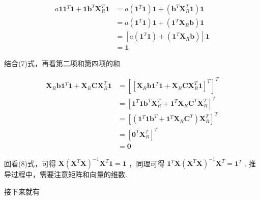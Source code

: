 \documentclass[UTF8]{ctexart}
\begin{document}
    \begin{equation}
    	\begin{aligned}
    		a \boldsymbol{1} \boldsymbol{1}^T \boldsymbol{1} + \boldsymbol{1} \boldsymbol{b}^T \boldsymbol{X}_R^T \boldsymbol{1} & = a (\boldsymbol{1}^T \boldsymbol{1}) \boldsymbol{1} + (\boldsymbol{b}^T \boldsymbol{X}_R^T \boldsymbol{1}) \boldsymbol{1} \\
    		& = a (\boldsymbol{1}^T \boldsymbol{1}) \boldsymbol{1} + (\boldsymbol{1}^T \boldsymbol{X}_R \boldsymbol{b}) \boldsymbol{1} \\
    		& = [a (\boldsymbol{1}^T \boldsymbol{1}) + (\boldsymbol{1}^T \boldsymbol{X}_R \boldsymbol{b})] \boldsymbol{1} \\
    		& = \boldsymbol{1}
    	\end{aligned}
    \end{equation}

    结合(7)式，再看第二项和第四项的和
    
    \begin{equation}
    	\begin{aligned}
    		\boldsymbol{X}_R \boldsymbol{b} \boldsymbol{1}^T \boldsymbol{1} + \boldsymbol{X}_R \boldsymbol{C} \boldsymbol{X}_R^T \boldsymbol{1} & = [[\boldsymbol{X}_R \boldsymbol{b} \boldsymbol{1}^T \boldsymbol{1} + \boldsymbol{X}_R \boldsymbol{C} \boldsymbol{X}_R^T \boldsymbol{1}]^T]^T \\
    		& = [\boldsymbol{1}^T \boldsymbol{1} \boldsymbol{b}^T \boldsymbol{X}_R^T + \boldsymbol{1}^T \boldsymbol{X}_R \boldsymbol{C}^T \boldsymbol{X}_R^T]^T \\
    		& = [(\boldsymbol{1}^T \boldsymbol{1} \boldsymbol{b}^T + \boldsymbol{1}^T \boldsymbol{X}_R \boldsymbol{C}^T) \boldsymbol{X}_R^T]^T \\
    		& =  [\boldsymbol{0}^T \boldsymbol{X}_R^T]^T \\
    		& = \boldsymbol{0}
       	\end{aligned}
    \end{equation}

    回看(8)式，可得 $ \boldsymbol{X} (\boldsymbol{X}^T \boldsymbol{X})^{-1} \boldsymbol{X}^T \boldsymbol{1} = \boldsymbol{1} $ ，同理可得 $ \boldsymbol{1}^T \boldsymbol{X} (\boldsymbol{X}^T \boldsymbol{X})^{-1} \boldsymbol{X}^T = \boldsymbol{1}^T $ . 推导过程中，需要注意矩阵和向量的维数.
    
    接下来就有
    
\end{document}
